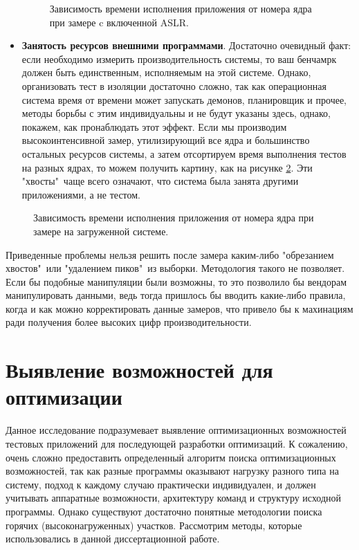 \begin{itemize}
	\begin{figure}[ht]
		\caption{Зависимость времени исполнения приложения от номера ядра при замере c включенной ASLR.}\label{fig:peaks}
	\end{figure}
	\item \textbf{Занятость ресурсов внешними программами}. Достаточно очевидный факт: если необходимо измерить производительность системы, то ваш бенчамрк должен быть единственным, исполняемым на этой системе.  Однако, организовать тест в изоляции достаточно сложно, так как операционная система время от времени может запускать демонов, планировщик и прочее,  методы борьбы с этим индивидуальны и не будут указаны здесь, однако, покажем, как пронаблюдать этот эффект. Если мы производим высокоинтенсивной замер, утилизирующий все ядра и большинство остальных ресурсов системы, а затем отсортируем время выполнения тестов на разных ядрах, то можем получить картину, как на рисунке \ref{fig:tails}. Эти "хвосты"\  чаще всего означают, что система была занята другими  приложениями, а не  тестом.
\end{itemize}


\begin{figure}[ht]
	\caption{Зависимость времени исполнения приложения от номера ядра при замере на загруженной системе.}\label{fig:tails}
\end{figure}



Приведенные проблемы нельзя решить после замера каким-либо "обрезанием хвостов"\  или "удалением пиков"\  из выборки. Методология такого не позволяет. Если бы подобные манипуляции были возможны, то это позволило бы вендорам манипулировать данными, ведь тогда пришлось бы вводить какие-либо правила, когда и как можно корректировать данные замеров, что привело бы к махинациям ради получения более высоких цифр производительности.

\section {Выявление возможностей для оптимизации}\label{p1:optop}
Данное исследование подразумевает выявление оптимизационных возможностей тестовых приложений для последующей разработки оптимизаций. К сожалению, очень сложно предоставить определенный алгоритм поиска оптимизационных возможностей, так как разные программы оказывают нагрузку разного типа на систему, подход к каждому случаю практически индивидуален, и должен учитывать аппаратные возможности, архитектуру команд и структуру исходной программы. Однако существуют достаточно понятные методологии поиска горячих (высоконагруженных) участков. Рассмотрим методы, которые использовались в данной диссертационной работе.

